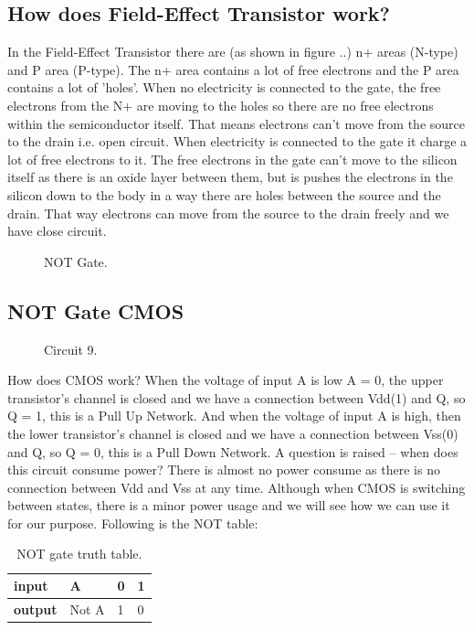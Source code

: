 \subsection{ How does Field-Effect Transistor work? }
In the Field-Effect Transistor there are (as shown in figure ..) n+ areas (N-type) and P area (P-type). The n+ area contains a lot of free electrons and the P area contains a lot of 'holes'. When no electricity is connected to the gate, the free electrons from the N+ are moving to the holes so there are no free electrons within the semiconductor itself. That means electrons can't move from the source to the drain i.e. open circuit. When electricity is connected to the gate it charge a lot of free electrons to it. The free electrons in the gate can't move to the silicon itself as there is an oxide layer between them, but is pushes the electrons in the silicon down to the body in a way there are holes between the source and the drain. That way electrons can move from the source to the drain freely and we have close circuit. 
\begin{figure}[h]
    \centering
    
    \caption{NOT Gate.} \label{fig:not}
\end{figure}
\subsection{ NOT Gate CMOS}
\begin{figure}
    \centering
    
    \caption{Circuit 9.} \label{fig:circuit9}
\end{figure}
How does CMOS work? When the voltage of input A is low A = 0, the upper transistor's channel is closed and we have a connection between Vdd(1) and Q, so Q = 1, this is a Pull Up Network. And when the voltage of input A is high, then the lower transistor's channel is closed and we have a connection between Vss(0) and Q, so Q = 0, this is a Pull Down Network.
A question is raised – when does this circuit consume power? There is almost no power consume as there is no connection between Vdd and Vss at any time. Although when CMOS is switching between states, there is a minor power usage and we will see how we can use it for our purpose.
Following is the NOT table:
\begin{table}
    \centering
    \begin{tabular}{|l|l|l|l|}
        \hline
        \textbf{input}  & A     & 0 & 1 \\ \hline
        \textbf{output} & Not A & 1 & 0 \\ \hline
    \end{tabular}
    \caption{NOT gate truth table.}
\end{table} 
